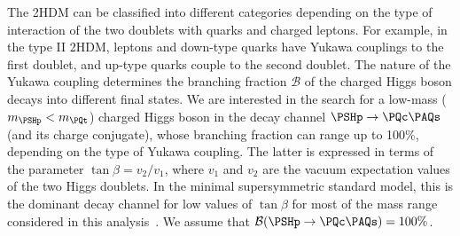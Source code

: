 The 2HDM can be classified into different categories depending on the
type of interaction of the two doublets with quarks and charged
leptons. For example, in the type II 2HDM, leptons and down-type 
quarks have Yukawa couplings to the first doublet, and up-type 
quarks couple to the second doublet. The nature of the Yukawa
coupling determines the branching fraction $\mathcal{B}$ of the charged Higgs boson
decays into different final states. We are interested in the search
for a low-mass ($\mhp < \mt$) charged Higgs boson in the decay
channel $\PSHp \to \PQc\PAQs$ (and its charge conjugate), whose
branching fraction can range up to 100\%, depending on the type of
Yukawa coupling. The latter is expressed in terms of the parameter
$\tan\beta=v_2/v_1$, where $v_1$ and $v_2$ are the vacuum expectation
values of the two Higgs doublets. In the minimal supersymmetric
standard model, this is the dominant decay channel for low
values of $\tan\beta$ for most of the mass range considered in this
analysis~\cite{Aoki:2009ha,Ma:1997up}. We assume that
$\BHcs = 100\%$.

